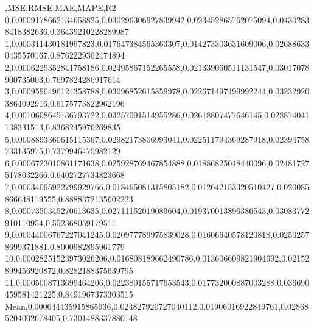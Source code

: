 ,MSE,RMSE,MAE,MAPE,R2
0,0.0009178662134658825,0.030296306927839942,0.023452865762075094,0.04302838418382636,0.36439210228289987
1,0.000311430181997823,0.017647384565363307,0.014273303631609006,0.026886330435570167,0.8762229362474894
2,0.0006229352841758186,0.02495867152265558,0.021339060511131547,0.03017078900735003,0.7697824286917614
3,0.0009590496124358788,0.03096852615859978,0.022671497499992244,0.032329203864092916,0.6175773822962196
4,0.0010608645136793722,0.03257091514955286,0.02618807477646145,0.028874041138331513,0.8368245976269835
5,0.0008893360615115367,0.02982173806993041,0.022511794369287918,0.02394758733135975,0.7379946475982129
6,0.0006723010861171638,0.025928769467854888,0.01886825048440096,0.024817275178032266,0.6402727734823668
7,0.00034095922799929766,0.018465081315805182,0.012642153320510427,0.020085866648119555,0.8888372135602223
8,0.0007350345270613635,0.02711152019089604,0.019370013896386543,0.03083772910110954,0.552368059179511
9,0.00044006767227041245,0.020977789975839028,0.01606640578120818,0.02502578699371881,0.8000982895961779
10,0.00028251523973026206,0.016808189662490786,0.013606609821904692,0.02152899456920872,0.8282188375639795
11,0.0005008713699464206,0.022380155717653543,0.017732000887003288,0.036690459581421225,0.8491967373303515
Mean,0.000644435915865936,0.024827920727040112,0.01906016922849761,0.028685204002678405,0.7301488337880148
